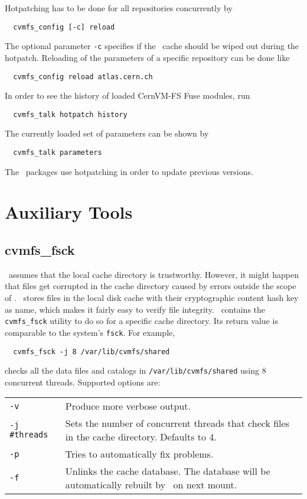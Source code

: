 Hotpatching has to be done for all repositories concurrently by
\begin{verbatim}
  cvmfs_config [-c] reload
\end{verbatim}
The optional parameter \texttt{-c} specifies if the \cvmfs\ cache should be wiped out during the hotpatch.
Reloading of the parameters of a specific repository can be done like
\begin{verbatim}
  cvmfs_config reload atlas.cern.ch
\end{verbatim}
In order to see the history of loaded CernVM-FS Fuse modules, run
\begin{verbatim}
  cvmfs_talk hotpatch history
\end{verbatim}
The currently loaded set of parameters can be shown by
\begin{verbatim}
  cvmfs_talk parameters
\end{verbatim}
The \cvmfs\ packages use hotpatching in order to update previous versions.


\section{Auxiliary Tools}
\label{sct:tools}

\subsection{cvmfs\_fsck}
\cvmfs\ assumes that the local cache directory is trustworthy.
However, it might happen that files get corrupted in the cache directory caused by errors outside the scope of \cvmfs.
\cvmfs\ stores files in the local disk cache with their cryptographic content hash key as name, which makes it fairly easy to verify file integrity.
\cvmfs\ contains the \texttt{cvmfs\_fsck} utility to do so for a specific cache directory. 
Its return value is comparable to the system's \texttt{fsck}.
For example,
\begin{verbatim}
  cvmfs_fsck -j 8 /var/lib/cvmfs/shared
\end{verbatim}
checks all the data files and catalogs in \texttt{/var/lib/cvmfs/shared} using 8 concurrent threads.  
Supported options are:

\begin{tabularx}{\linewidth}{lX}
	\texttt{-v}				& Produce more verbose output.\\
	\texttt{-j \#threads}	& Sets the number of concurrent threads that check files in the cache directory. Defaults to 4. \\
	\texttt{-p} 			& Tries to automatically fix problems. \\
	\texttt{-f} 			& Unlinks the cache database.  The database will be automatically rebuilt by \cvmfs\ on next mount.\\
\end{tabularx}


